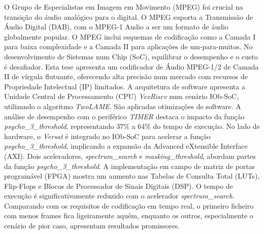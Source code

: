 \hspace{0.4cm} O Grupo de Especialistas em Imagem em Movimento (MPEG) foi crucial na transição do áudio analógico para o digital. O MPEG suporta a Transmissão de Áudio Digital (DAB), com o MPEG-1 Audio a ser um formato de áudio globalmente popular. O MPEG inclui esquemas de codificação como a Camada I para baixa complexidade e a Camada II para aplicações de um-para-muitos.
No desenvolvimento de Sistemas num Chip (SoC), equilibrar o desempenho e o custo é desafiador. Esta tese apresenta um codificador de Áudio MPEG-1/2 de Camada II de vírgula flutuante, oferecendo alta precisão num mercado com recursos de Propriedade Intelectual (IP) limitados.
A arquitetura de software apresenta a Unidade Central de Processamento (CPU) \textit{VexRiscv} num cenário IOb-SoC, utilizando o algoritmo \textit{TwoLAME}. São aplicadas otimizações de software. A análise de desempenho com o periférico \textit{TIMER} destaca o impacto da função \textit{psycho\_3\_threshold}, representando 37\% a 64\% do tempo de execução.
No lado de hardware, o \textit{Versat} é integrado no IOb-SoC para acelerar a função \textit{psycho\_3\_threshold}, implicando a expansão da Advanced eXtensible Interface (AXI). Dois aceleradores, \textit{spectrum\_search} e \textit{masking\_threshold}, abordam partes da função \textit{psycho\_3\_threshold}. A implementação em campo de matriz de portas programável (FPGA) mostra um aumento nas Tabelas de Consulta Total (LUTs), Flip-Flops e Blocos de Processador de Sinais Digitais (DSP).
O tempo de execução é significativamente reduzido com o acelerador \textit{spectrum\_search}.
Comparando com os requisitos de codificação em tempo real, o primeiro ficheiro com menos frames fica ligeiramente aquém, enquanto os outros, especialmente o cenário de pior caso, apresentam resultados promissores.